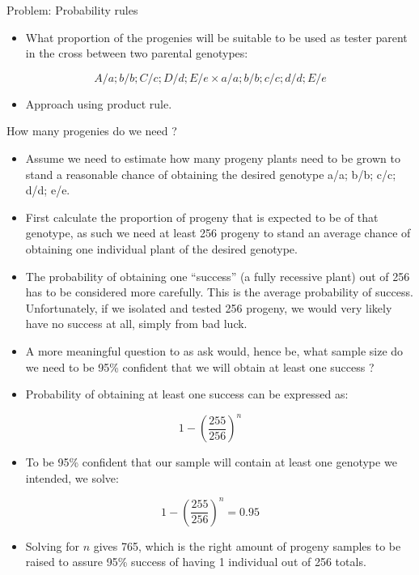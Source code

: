 \documentclass[11pt,ignorenonframetext,aspectratio=169]{beamer}
\providecommand{\tightlist}{%
  \setlength{\itemsep}{0pt}\setlength{\parskip}{0pt}}
\begin{document}
\begin{frame}{Problem: Probability rules}
\protect\hypertarget{problem-probability-rules}{}
\begin{itemize}
\tightlist
\item
  What proportion of the progenies will be suitable to be used as tester
  parent in the cross between two parental genotypes:
\end{itemize}

\[
A/a;b/b;C/c;D/d;E/e \times a/a;b/b;c/c;d/d;E/e
\]

\begin{itemize}
\tightlist
\item
  Approach using product rule.
\end{itemize}
\end{frame}

\begin{frame}{How many progenies do we need ?}
\protect\hypertarget{how-many-progenies-do-we-need}{}
\begin{itemize}
\tightlist
\item
  Assume we need to estimate how many progeny plants need to be grown to
  stand a reasonable chance of obtaining the desired genotype a/a; b/b;
  c/c; d/d; e/e.
\item
  First calculate the proportion of progeny that is expected to be of
  that genotype, as such we need at least 256 progeny to stand an
  average chance of obtaining one individual plant of the desired
  genotype.
\item
  The probability of obtaining one ``success'' (a fully recessive plant)
  out of 256 has to be considered more carefully. This is the average
  probability of success. Unfortunately, if we isolated and tested 256
  progeny, we would very likely have no success at all, simply from bad
  luck.
\item
  A more meaningful question to as ask would, hence be, what sample size
  do we need to be 95\% confident that we will obtain at least one
  success ?
\item
  Probability of obtaining at least one success can be expressed as:
\end{itemize}

\[
1-\left(\frac{255}{256}\right)^n
\]
\end{frame}

\begin{frame}{}
\protect\hypertarget{section}{}
\begin{itemize}
\tightlist
\item
  To be 95\% confident that our sample will contain at least one
  genotype we intended, we solve:
\end{itemize}

\[
1-\left(\frac{255}{256}\right)^n = 0.95
\]

\begin{itemize}
\tightlist
\item
  Solving for \(n\) gives 765, which is the right amount of progeny
  samples to be raised to assure 95\% success of having 1 individual out
  of 256 totals.
\end{itemize}
\end{frame}
\end{document}
